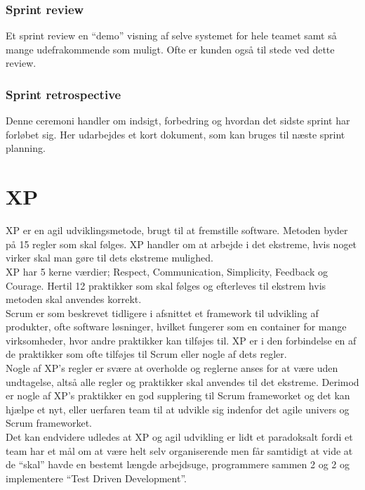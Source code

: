\subsubsection{Sprint review}
Et sprint review en “demo” visning af selve systemet for hele teamet samt så mange udefrakommende som muligt. Ofte er kunden også til stede ved dette review.

\subsubsection{Sprint retrospective}
Denne ceremoni handler om indsigt, forbedring og hvordan det sidste sprint har forløbet sig. Her udarbejdes et kort dokument, som kan bruges til næste sprint planning.

\section{XP}\label{sec:xp}
XP er en agil udviklingsmetode, brugt til at fremstille software. Metoden byder på 15 regler som skal følges. XP handler om at arbejde i det ekstreme, 
hvis noget virker skal man gøre til dets ekstreme mulighed.  \\

XP har 5 kerne værdier; Respect, Communication, Simplicity, Feedback og Courage. Hertil 12 praktikker som skal følges og efterleves til 
ekstrem hvis metoden skal anvendes korrekt. \\

Scrum er som beskrevet tidligere i afsnittet et framework til udvikling af produkter, ofte software løsninger, hvilket fungerer som en 
container for mange virksomheder, hvor andre praktikker kan tilføjes til. XP er i den forbindelse en af de praktikker som ofte tilføjes til 
Scrum eller nogle af dets regler. \\

Nogle af XP’s regler er svære at overholde og reglerne anses for at være uden undtagelse, altså alle regler og praktikker skal anvendes til 
det ekstreme. Derimod er nogle af XP’s praktikker en god supplering til Scrum frameworket og det kan hjælpe et nyt, eller uerfaren team til at 
udvikle sig indenfor det agile univers og Scrum frameworket. \\

Det kan endvidere udledes at XP og agil udvikling er lidt et paradoksalt fordi et team har et mål om at være helt selv organiserende men får 
samtidigt at vide at de “skal” havde en bestemt længde arbejdsuge, programmere sammen 2 og 2 og implementere “Test Driven Development”. 

